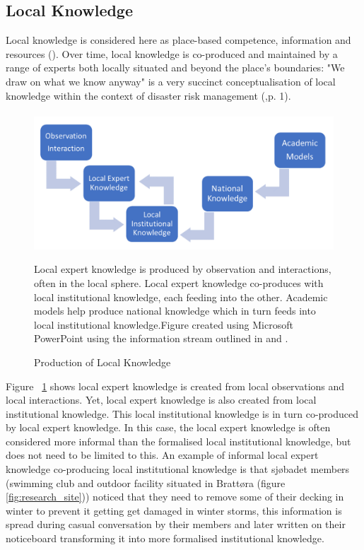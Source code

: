 \subsection{Local Knowledge}

Local knowledge is considered here as place-based competence, information and resources (\cite{setten_we_2019}). Over time,  local knowledge is co-produced and maintained by a range of experts both locally situated and beyond the place's boundaries: "We draw on what we know anyway" is a very succinct conceptualisation of local knowledge within the context of disaster risk management (\cite{setten_we_2019},p. 1). 
\paragraph{}

\begin{figure}[ht]
    \centering
    \includegraphics[width=1\textwidth]{fig_theory/local knowledge accumulation.png}
    \caption{Production of Local Knowledge }{ Local expert knowledge is produced by observation and interactions, often in the local sphere. Local expert knowledge co-produces with local institutional knowledge, each feeding into the other. Academic models help produce national knowledge which in turn feeds into local institutional knowledge.Figure created using Microsoft PowerPoint using the information stream outlined in \cite{setten_we_2019} and \cite{rod_integrated_2012}.}
    \label{fig:local_knowledge}
\end{figure}


Figure ~\ref{fig:local_knowledge} shows local expert knowledge is created from local observations and local interactions. Yet, local expert knowledge is also created from local institutional knowledge. This local institutional knowledge is in turn co-produced by local expert knowledge. In this case, the local expert knowledge is often considered more informal than the formalised local institutional knowledge, but does not need to be limited to this. An example of informal local expert knowledge co-producing local institutional knowledge is that sjøbadet members (swimming club and outdoor facility situated in Brattøra (figure \ref{fig:research_site})) noticed that they need to remove some of their decking in winter to prevent it getting get damaged in winter storms, this information is spread during casual conversation by their members and later written on their noticeboard transforming it into more formalised institutional knowledge. 
